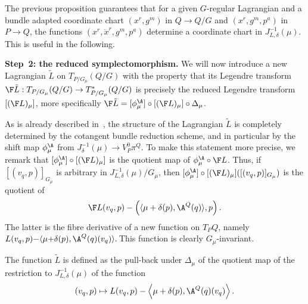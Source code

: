 The previous proposition guarantees that for a given $G$-regular Lagrangian and a bundle adapted coordinate chart $(x^r,g^m)$ in $Q\to Q/G$ and $(x^r,g^m,p^a)$ in $P\to Q$, the functions $(x^r,\dot x^r,g^m,p^a)$ determine a coordinate chart in $J^{-1}_{L,\delta}(\mu)$. This is useful in the following.

{\bf Step~2: the reduced symplectomorphism.}
We will now introduce a new Lagrangian $\tilde L$ on $T_{P/G_\mu}(Q/G)$ with the property that its Legendre transform $\F \tilde L: T_{P/G_\mu} (Q/G) \to T^*_{P/G_\mu}(Q/G)$ is precisely the reduced Legendre transform $[(\F L)_\mu]$, more specif\/ically $\F \tilde L= [\phi^\A_\mu]\circ[(\F L)_\mu] \circ \Delta_\mu$.

As is already described in~\cite{BC}, the structure of the Lagrangian $\tilde L$ is completely determined by the cotangent bundle reduction scheme, and in particular by the shift map $\phi^\A_\mu$ from $J^{-1}_\delta(\mu) \to V^0_P\pi^Q$. To make this statement more precise, we remark that $[\phi^\A_\mu]\circ[(\F L)_\mu]$ is the quotient map of $\phi^\A_\mu\circ \F L$. Thus, if $[(v_q,p)]_{G_\mu}$ is arbitrary in $J^{-1}_{L,\delta}(\mu)/G_\mu$, then $[\phi^\A_\mu]\circ[(\F L)_\mu]([(v_q,p)]_{G_\mu})$ is the quotient of \[\F L(v_q,p) - \left(\langle\mu+\delta(p),\A^Q(q)\rangle,p\right).\]
 The latter is the f\/ibre derivative of a new function on $T_PQ$, namely $L(v_q,p) {-} \langle \mu{+}\delta(p),\A^Q(q)(v_q)\rangle.\!$ This function is clearly $G_\mu$-invariant.

\begin{definition} The function $\tilde L$ is def\/ined as the pull-back under $\Delta_\mu$ of the quotient map of the restriction to $J^{-1}_{L,\delta}(\mu)$ of the function \[
(v_q,p) \mapsto L(v_q,p)- \left\langle \mu+\delta(p), \A^Q(q)(v_q)\right\rangle.
\]
\end{definition}

